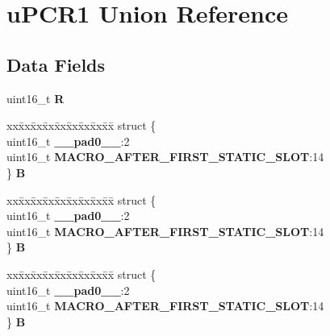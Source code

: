 \hypertarget{unionuPCR1}{}\section{u\+P\+C\+R1 Union Reference}
\label{unionuPCR1}
\subsection*{Data Fields}
\begin{DoxyCompactItemize}
\item 
\mbox{\label{unionuPCR1_a8c32f8708aa4b8fb8fd5a503319bd102}} 
uint16\+\_\+t {\bfseries R}
\item 
\mbox{\label{unionuPCR1_ac08caca02d8dac856e374bdc8b6b07be}} 
\begin{tabbing}
xx\=xx\=xx\=xx\=xx\=xx\=xx\=xx\=xx\=\kill
struct \{\\
\>uint16\_t {\bfseries \_\_pad0\_\_}:2\\
\>uint16\_t {\bfseries MACRO\_AFTER\_FIRST\_STATIC\_SLOT}:14\\
\} {\bfseries B}\\

\end{tabbing}\item 
\mbox{\label{unionuPCR1_a52bba71e9a8291f7d90f3bb5b730a4b8}} 
\begin{tabbing}
xx\=xx\=xx\=xx\=xx\=xx\=xx\=xx\=xx\=\kill
struct \{\\
\>uint16\_t {\bfseries \_\_pad0\_\_}:2\\
\>uint16\_t {\bfseries MACRO\_AFTER\_FIRST\_STATIC\_SLOT}:14\\
\} {\bfseries B}\\

\end{tabbing}\item 
\mbox{\label{unionuPCR1_ad827b56ce1fbde4cb42ddbf057253eda}} 
\begin{tabbing}
xx\=xx\=xx\=xx\=xx\=xx\=xx\=xx\=xx\=\kill
struct \{\\
\>uint16\_t {\bfseries \_\_pad0\_\_}:2\\
\>uint16\_t {\bfseries MACRO\_AFTER\_FIRST\_STATIC\_SLOT}:14\\
\} {\bfseries B}\\


\end{tabbing}
\end{DoxyCompactItemize}
